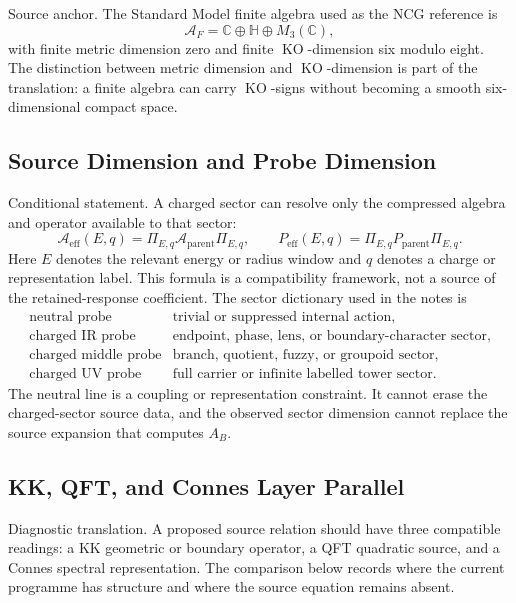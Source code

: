 \documentclass[11pt]{article}
\newcommand{\CC}{\mathbb{C}}
\newcommand{\HH}{\mathbb{H}}
\newcommand{\AF}{\mathcal A_F}
\newcommand{\KO}{\operatorname{KO}}
\begin{document}
Source anchor.  The Standard Model finite algebra used as the NCG reference
is
\[
  \AF=\CC\oplus \HH\oplus M_3(\CC),
\]
with finite metric dimension zero and finite \(\KO\)-dimension six modulo
eight.  The distinction between metric dimension and \(\KO\)-dimension is
part of the translation: a finite algebra can carry \(\KO\)-signs without
becoming a smooth six-dimensional compact space.

\subsection{Source Dimension and Probe Dimension}

Conditional statement.  A charged sector can resolve only the compressed
algebra and operator available to that sector:
\[
  \mathcal A_{\mathrm{eff}}(E,q)
    =\Pi_{E,q}\mathcal A_{\mathrm{parent}}\Pi_{E,q},
  \qquad
  P_{\mathrm{eff}}(E,q)
    =\Pi_{E,q}P_{\mathrm{parent}}\Pi_{E,q}.
\]
Here \(E\) denotes the relevant energy or radius window and \(q\) denotes a
charge or representation label.  This formula is a compatibility framework,
not a source of the retained-response coefficient.
The sector dictionary used in the notes is
\[
\begin{array}{ll}
\text{neutral probe} & \text{trivial or suppressed internal action},\\
\text{charged IR probe} & \text{endpoint, phase, lens, or boundary-character sector},\\
\text{charged middle probe} & \text{branch, quotient, fuzzy, or groupoid sector},\\
\text{charged UV probe} & \text{full carrier or infinite labelled tower sector}.
\end{array}
\]
The neutral line is a coupling or representation constraint.  It cannot erase
the charged-sector source data, and the observed sector dimension cannot
replace the source expansion that computes \(A_B\).

\subsection{KK, QFT, and Connes Layer Parallel}

Diagnostic translation.  A proposed source relation should have three
compatible readings: a KK geometric or boundary operator, a QFT quadratic
source, and a Connes spectral representation.  The comparison below records
where the current programme has structure and where the source equation
remains absent.
\end{document}

